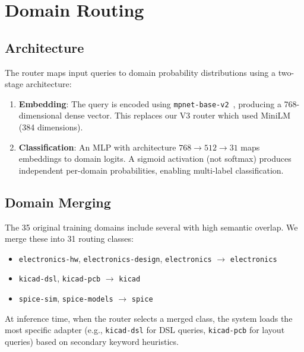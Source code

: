 \documentclass[11pt,a4paper]{article}
\begin{document}
\section{Domain Routing}
\label{sec:routing}

\subsection{Architecture}

The router maps input queries to domain probability distributions using a two-stage architecture:

\begin{enumerate}[nosep]
  \item \textbf{Embedding}: The query is encoded using \texttt{mpnet-base-v2}~\citep{song2020mpnet}, producing a 768-dimensional dense vector. This replaces our V3 router which used MiniLM (384 dimensions).
  \item \textbf{Classification}: An MLP with architecture $768 \rightarrow 512 \rightarrow 31$ maps embeddings to domain logits. A sigmoid activation (not softmax) produces independent per-domain probabilities, enabling multi-label classification.
\end{enumerate}

\subsection{Domain Merging}

The 35 original training domains include several with high semantic overlap. We merge these into 31 routing classes:
\begin{itemize}[nosep]
  \item \texttt{electronics-hw}, \texttt{electronics-design}, \texttt{electronics} $\rightarrow$ \texttt{electronics}
  \item \texttt{kicad-dsl}, \texttt{kicad-pcb} $\rightarrow$ \texttt{kicad}
  \item \texttt{spice-sim}, \texttt{spice-models} $\rightarrow$ \texttt{spice}
\end{itemize}

At inference time, when the router selects a merged class, the system loads the most specific adapter (e.g., \texttt{kicad-dsl} for DSL queries, \texttt{kicad-pcb} for layout queries) based on secondary keyword heuristics.
\end{document}
